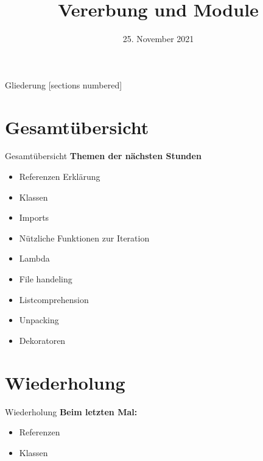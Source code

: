 



\title{Vererbung und Module}
\date{25. November 2021}


	
\maketitle

\begin{frame}{Gliederung}
	[sections numbered]
	\tableofcontents
\end{frame}

\section*{Gesamtübersicht}
\begin{frame}{Gesamtübersicht}
	\textbf{Themen der nächsten Stunden}
	\begin{itemize}
		\item Referenzen Erklärung
		\item  \alert{Klassen}
		\item \alert{Imports}
		\item Nützliche Funktionen zur Iteration
		\item Lambda
		\item File handeling
		\item Listcomprehension
		\item Unpacking
		\item Dekoratoren
	\end{itemize}
\end{frame}

\section{Wiederholung}
\begin{frame}{Wiederholung}
	\textbf{Beim letzten Mal:}
	\begin{itemize}
		\item Referenzen
		\item Klassen 
		
	\end{itemize}	
\end{frame}


